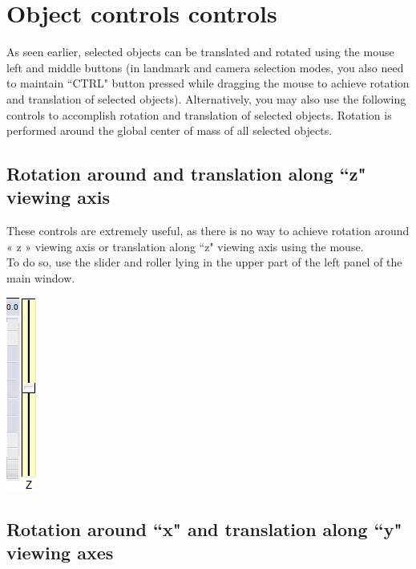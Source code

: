   \section{Object controls controls}
	As seen earlier, selected objects can be translated and rotated using the mouse left and middle buttons
(in landmark and camera selection modes, you also need to maintain ``CTRL" button pressed
while dragging the mouse to achieve rotation and translation of selected objects). Alternatively, you
may also use the following controls to accomplish rotation and translation of selected objects. Rotation
is performed around the global center of mass of all selected objects.

\subsection{Rotation around and translation along ``z" viewing axis}

\begin{minipage}{0.7\textwidth}
These controls are extremely useful, as there is no way to achieve rotation
around « z » viewing axis or translation along ``z" viewing axis using the
mouse. \\
To do so, use the slider and roller lying in the upper part of the left panel of the
main window.

\end{minipage}    
\begin{minipage}{0.25\textwidth}\centering
  \includegraphics{images/Icons/x_rot.png}
 \end{minipage}    


\subsection{Rotation around ``x" and translation along ``y" viewing axes}

